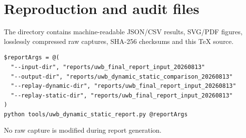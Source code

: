 \documentclass[10pt,a4paper]{article}
\begin{document}
\section{Reproduction and audit files}
The directory contains machine-readable JSON/CSV results, SVG/PDF figures,
losslessly compressed raw captures, SHA-256 checksums and this TeX source.

\begin{verbatim}
$reportArgs = @(
  "--input-dir", "reports/uwb_final_report_input_20260813"
  "--output-dir", "reports/uwb_dynamic_static_comparison_20260813"
  "--replay-dynamic-dir", "reports/uwb_final_report_input_20260813"
  "--replay-static-dir", "reports/uwb_final_report_input_20260813"
)
python tools/uwb_dynamic_static_report.py @reportArgs
\end{verbatim}

No raw capture is modified during report generation.
\end{document}
